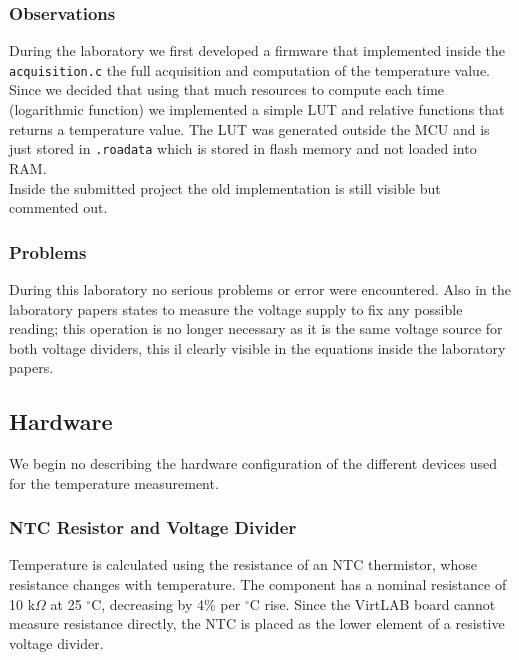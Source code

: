 \documentclass[../main.tex]{subfiles}
\begin{document}
\subsubsection*{Observations}

During the laboratory we first developed a firmware that implemented inside the \texttt{acquisition.c} the full acquisition and computation of the temperature value. Since we decided that using that much resources to compute each time (logarithmic function) we implemented a simple LUT and relative functions that returns a temperature value. The LUT was generated outside the MCU and is just stored in \texttt{.roadata} which is stored in flash memory and not loaded into RAM.\\

Inside the submitted project the old implementation is still visible but commented out.

\subsubsection*{Problems}


During this laboratory no serious problems or error were encountered.
Also in the laboratory papers states to measure the voltage supply to fix any possible reading; this operation is no longer necessary as it is the same voltage source for both voltage dividers, this il clearly visible in the equations inside the laboratory papers.











\subsection{Hardware}

We begin no describing the hardware configuration of the different devices used for the temperature measurement.\\

\subsubsection*{NTC Resistor and Voltage Divider}

Temperature is calculated using the resistance of an NTC thermistor, whose resistance changes with temperature. The component has a nominal resistance of 10 k$\Omega$ at 25 $^\circ$C, decreasing by 4\% per $^\circ$C rise.
Since the VirtLAB board cannot measure resistance directly, the NTC is placed as the lower element of a resistive voltage divider.
\end{document}
